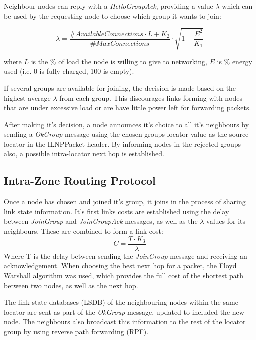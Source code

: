 \documentclass[12pt]{article}
\begin{document}
Neighbour nodes can reply with a \emph{HelloGroupAck}, providing a value $\lambda$ which can be used by the requesting node to choose which group it wants to join:

\begin{equation}
    \lambda = \frac{\textit{#AvailableConnections} \cdot L + K_2}{\textit{#MaxConnections}} \cdot \sqrt{1 - \frac{E^2}{K_1}}
\end{equation}

where $L$ is the \% of load the node is willing to give to networking, $E$ is \% energy used (i.e. 0 is fully charged, 100 is empty). 

If several groups are available for joining, the decision is made based on the highest average $\lambda$ from each group. This discourages links forming with nodes that are under excessive load or are have little power left for forwarding packets.

After making it's decision, a node announces it's choice to all it's neighbours by sending a \emph{OkGroup} message using the chosen groups locator value as the source locator in the ILNPPacket header. By informing nodes in the rejected groups also, a possible intra-locator next hop is established.

\subsection{Intra-Zone Routing Protocol}

Once a node has chosen and joined it's group, it joins in the process of sharing link state information. It's first links costs are established using the delay between \emph{JoinGroup} and \emph{JoinGroupAck} messages, as well as the $\lambda$ values for its neighbours. These are combined to form a link cost: 
\begin{equation}
    C = \frac{T \cdot K_3}{\lambda}
\end{equation}
Where T is the delay between sending the \emph{JoinGroup} message and receiving an acknowledgement.
When choosing the best next hop for a packet, the Floyd Warshall \cite{floyd} algorithm was used, which provides the full cost of the shortest path between two nodes, as well as the next hop. 

The link-state databases (LSDB) of the neighbouring nodes within the same locator are sent as part of the \emph{OkGroup} message, updated to included the new node. The neighbours also broadcast this information to the rest of the locator group by using reverse path forwarding (RPF).
\end{document}

